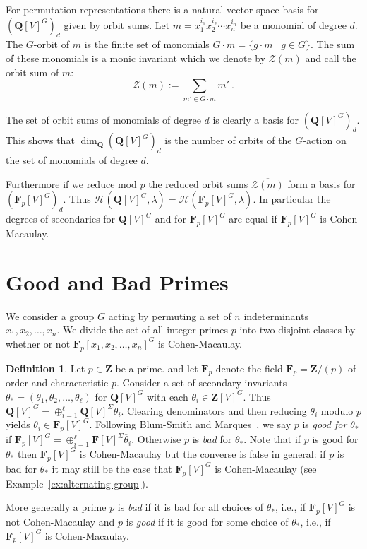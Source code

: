 \documentclass[12pt]{amsart}
\newcommand{\QQ}{\mathbf{Q}} %
\newcommand{\ZZ}{\mathbf{Z}} %
\newcommand{\FF}{\mathbf{F}} %
\newcommand{\QQ}{\mathbb{Q}} %
\newcommand{\ZZ}{\mathbb{Z}} %
\newcommand{\FF}{\mathbb{F}} %
\theoremstyle{definition}
\newtheorem{defn}[thm]{Definition}
\newcommand{\calh}{\mathcal{H}}
\newcommand{\calz}{\mathcal{Z}}
\newcommand{\btheta}{{\overline{\theta}}}
\newcommand{\bth}{{{\theta_*}}} %
\begin{document}
For permutation representations there is a natural vector space basis for 
$(\QQ[V]^G)_d$ given by orbit sums.  Let $m=x_1^{i_1} x_2^{i_2} \cdots x_n^{i_n}$ be a monomial of degree $d$.  
The $G$-orbit of $m$ is the finite set of monomials 
$G\cdot m = \{g \cdot m \mid g \in G\}$.
The sum of these monomials is a monic invariant 
which we denote by $\calz(m)$ and call the orbit sum of $m$:
$$\calz(m) := \sum_{m' \in G\cdot m} m'\ .$$


The set of orbit sums of monomials of degree $d$ is clearly a basis for $(\QQ[V]^G)_d$.  This shows that 
$\dim_{\QQ} (\QQ[V]^G)_d$ is the number of orbits of the $G$-action on the set of monomials of degree $d$.


Furthermore if we reduce mod $p$ the reduced orbit sums $\overline{\calz(m)}$ form a basis for $(\FF_p[V]^G)_d$.  Thus
$\calh(\QQ[V]^G,\lambda) = \calh(\FF_p[V]^G,\lambda)$.
In particular the degrees of secondaries for 
$\QQ[V]^G$ and for $\FF_p[V]^G$ are equal if $\FF_p[V]^G$ is Cohen-Macaulay.  

\section{Good and Bad Primes}\label{good and bad}



We consider a group $G$ acting by permuting a set of $n$ indeterminants
$x_1,x_2,\dots,x_n$.  We divide the set of all integer primes $p$ 
into two disjoint classes by whether or not  
$\FF_p[x_1,x_2,\dots,x_n]^G$ is Cohen-Macaulay.

   
\begin{defn}
  Let $p \in \ZZ$ be a prime. 
  and let $\FF_p$ denote the field $\FF_p = \ZZ/(p)$ of order 
  and characteristic $p$.
  Consider a set of secondary invariants 
  $\bth = (\theta_1,\theta_2,\dots,\theta_\ell)$
  for $\QQ[V]^G$ with each $\theta_i \in \ZZ[V]^G$.  
  Thus $\QQ[V]^G = \oplus_{i=1}^\ell \QQ[V]^{\Sigma} \theta_i$.
  Clearing denominators and then reducing $\theta_i$ modulo $p$ yields $\btheta_i \in \FF_p[V]^G$.  
  Following Blum-Smith and Marques~\cite{BenandSophie},
  we say $p$ is \emph{good for $\bth$}  
  if $\FF_p[V]^G=\oplus_{i=1}^\ell \FF[V]^{\Sigma} \btheta_i$.  Otherwise $p$ is \emph{bad} for $\bth$. 
  Note that if $p$ is good for $\bth$ then $\FF_p[V]^G$ is Cohen-Macaulay but
  the converse is false in general: if $p$ is bad for $\bth$
  it may still be the case that $\FF_p[V]^G$ is Cohen-Macaulay (see
  Example~\ref{ex:alternating group}).
  
  More generally a prime $p$ is \emph{bad} if it is bad for all choices 
  of $\bth$, i.e., if $\FF_p[V]^G$ is not Cohen-Macaulay and $p$ is 
  \emph{good} if it is good for some choice of $\bth$, i.e., if
  $\FF_p[V]^G$ is Cohen-Macaulay.
\end{defn}
\end{document}
